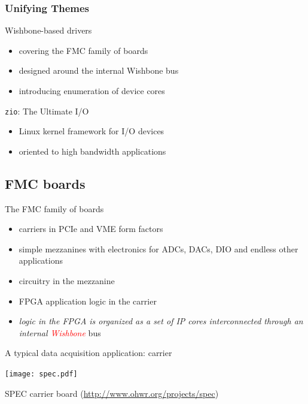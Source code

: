 \documentclass[compress,red]{beamer}
\begin{document}
\begin{frame}
\frametitle{Unifying Themes}
\pause
\begin{block}{Wishbone-based drivers}
\begin{itemize}
\item covering the FMC family of boards
\item designed around the internal Wishbone bus
\item introducing enumeration of device cores
\end{itemize}
\pause
\end{block}
\begin{block}{\texttt{zio}: The Ultimate I/O}
\begin{itemize}
\item Linux kernel framework for I/O devices
\item oriented to high bandwidth applications
\end{itemize}
\end{block}


\end{frame}

\subsection{FMC boards}
\begin{frame}{The FMC family of boards}
\begin{itemize}
\item carriers in PCIe and VME form factors
\item simple mezzanines with electronics for ADCs, DACs, DIO and endless
    other applications
\item circuitry in the mezzanine
\item FPGA application logic in the carrier
\item \emph{logic in the FPGA is organized as a set of IP cores
    interconnected through an internal \textcolor{red}{Wishbone}}
    bus
\end{itemize}
\end{frame}
\begin{frame}{A typical data acquisition application: carrier}
\begin{center}
\texttt{[image: spec.pdf]}
\end{center}
\centering
SPEC carrier board (\url{http://www.ohwr.org/projects/spec})
\end{frame}
\end{document}

